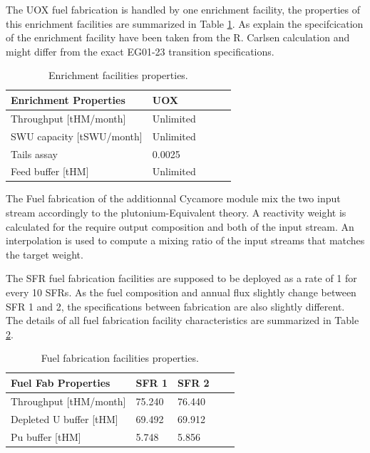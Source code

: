 \documentclass[12pt]{article}
\begin{document}
The UOX fuel fabrication is handled by one enrichment facility, the properties
of this enrichment facilities are summarized in Table \ref{tab:enrich_1}. As
explain the specifcication of the enrichment facility have been taken from the
R. Carlsen calculation and might differ from the exact EG01-23 transition
specifications. 

\begin{table}[h!]
    \centering
    \begin{tabular}{lllll}
    \hline
    Enrichment Properties      &  UOX        \\
    \hline
    Throughput [tHM/month]     &  Unlimited  \\
    SWU capacity [tSWU/month]  &  Unlimited  \\
    Tails assay                &  0.0025     \\
    Feed buffer [tHM]          &  Unlimited  \\
    \hline
    \end{tabular}
    \caption{Enrichment facilities properties. }
    \label{tab:enrich_1}
\end{table}


The Fuel fabrication of the additionnal Cycamore module mix the two
input stream accordingly to the plutonium-Equivalent theory\cite{Pueq}. A
reactivity weight is calculated for the require output composition and both of
the input stream. An interpolation is used to compute a mixing ratio of the input
streams that matches the target weight.

The SFR fuel fabrication facilities are supposed to be deployed as a rate of 1
for every 10 SFRs.  As the fuel composition and annual flux slightly change
between SFR 1 and 2, the specifications between fabrication are also slightly
different. The details of all fuel fabrication facility characteristics are
summarized in Table \ref{tab:fuelfab_1}.

\begin{table}[h!]
    \centering
    \begin{tabular}{lllll}
    \hline
    Fuel Fab Properties      &  SFR 1   &  SFR 2   \\
    \hline
    Throughput [tHM/month]   &  75.240  &  76.440  \\
    Depleted U buffer [tHM]  &  69.492  &  69.912  \\
    Pu buffer  [tHM]         &  5.748   &  5.856   \\
    \hline
    \end{tabular}
    \caption{Fuel fabrication facilities properties.}
    \label{tab:fuelfab_1}
\end{table}
\end{document}
